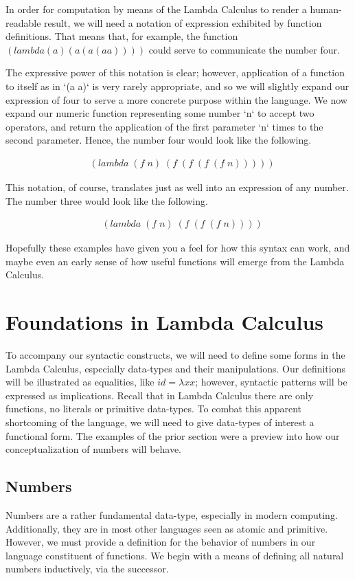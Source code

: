 In order for computation by means of the Lambda Calculus to render a 
human-readable result, we will need a notation of expression exhibited by function
definitions. That means that, for example, the function 
$(lambda (a) (a (a (a a))))$ could serve to communicate the number four.

The expressive power of this notation is clear; however, application of a function 
to itself as in `(a a)` is very rarely appropriate, and so we will slightly expand 
our expression of four to serve a more concrete purpose within the language. We
now expand our numeric function representing some number `n` to accept two
operators, and return the application of the first parameter `n` times to the
second parameter. Hence, the number four would look like the following.

\begin{align*}
& (lambda \; (f \; n) \; (f \; (f \; (f \; (f \; n)))))
\end{align*}

This notation, of course, translates just as well into an expression of any
number. The number three would look like the following.

\begin{align*}
& (lambda \; (f \; n) \; (f \; (f \; (f \; n))))
\end{align*}

Hopefully these examples have given you a feel for how this syntax can work, and
maybe even an early sense of how useful functions will emerge from the Lambda
Calculus.

\section{Foundations in Lambda Calculus}
To accompany our syntactic constructs, we will need to define some forms in the
Lambda Calculus, especially data-types and their manipulations. Our definitions
will be illustrated as equalities, like $id = \lambda xx$; however, syntactic
patterns will be expressed as implications. Recall that in Lambda Calculus there
are only functions, no literals or primitive data-types. To combat this apparent
shortcoming of the language, we will need to give data-types of interest a
functional form. The examples of the prior section were a preview into how our
conceptualization of numbers will behave.

\subsection{Numbers}
Numbers are a rather fundamental data-type, especially in modern computing.
Additionally, they are in most other languages seen as atomic and primitive.
However, we must provide a definition for the behavior of numbers in our language 
constituent of functions. We begin with a means of defining all natural numbers
inductively, via the successor.


